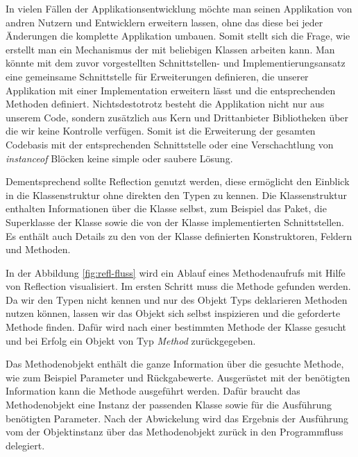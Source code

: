   In vielen Fällen der Applikationsentwicklung möchte man seinen Applikation von andren Nutzern und Entwicklern erweitern lassen, ohne das diese bei jeder Änderungen die komplette Applikation umbauen. Somit stellt sich die Frage, wie erstellt man ein Mechanismus der mit beliebigen Klassen arbeiten kann. Man könnte mit dem zuvor vorgestellten Schnittstellen- und Implementierungsansatz eine gemeinsame Schnittstelle für Erweiterungen definieren, die unserer Applikation mit einer Implementation erweitern lässt und die entsprechenden Methoden definiert. Nichtsdestotrotz besteht die Applikation nicht nur aus unserem Code, sondern zusätzlich aus Kern und Drittanbieter Bibliotheken über die wir keine Kontrolle verfügen. Somit ist die Erweiterung der gesamten Codebasis mit der entsprechenden Schnittstelle oder eine Verschachtlung von \textit{instanceof} Blöcken keine simple oder saubere Lösung. 


  Dementsprechend sollte Reflection genutzt werden, diese ermöglicht den Einblick in die Klassenstruktur ohne direkten den Typen zu kennen. Die Klassenstruktur enthalten Informationen über die Klasse selbst, zum Beispiel das Paket, die Superklasse der Klasse sowie die von der Klasse implementierten Schnittstellen. Es enthält auch Details zu den von der Klasse definierten Konstruktoren, Feldern und Methoden.\bigbreak

  In der Abbildung \ref{fig:refl-fluss} wird ein Ablauf eines Methodenaufrufs mit Hilfe von Reflection visualisiert. Im ersten Schritt muss die Methode gefunden werden. Da wir den Typen nicht kennen und nur des Objekt Typs deklarieren Methoden nutzen können, lassen wir das Objekt sich selbst inspizieren und die geforderte Methode finden. Dafür wird nach einer bestimmten Methode der Klasse gesucht und bei Erfolg ein Objekt von Typ \textit{Method} zurückgegeben. 


  Das Methodenobjekt enthält die ganze Information über die gesuchte Methode, wie zum Beispiel Parameter und Rückgabewerte. Ausgerüstet mit der benötigten Information kann die Methode ausgeführt werden. Dafür braucht das Methodenobjekt eine Instanz der passenden Klasse sowie für die Ausführung benötigten Parameter. Nach der Abwickelung wird das Ergebnis der Ausführung vom der Objektinstanz über das Methodenobjekt zurück in den Programmfluss delegiert. 

